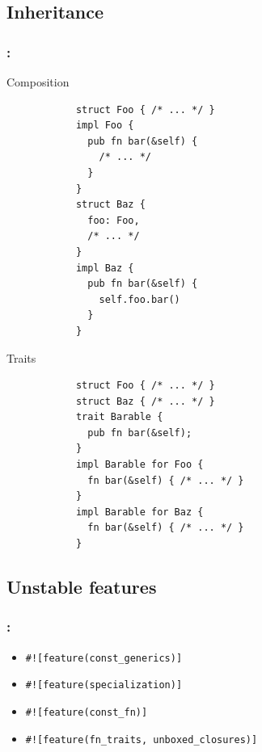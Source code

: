 \documentclass[aspectratio=43, t]{beamer}
\begin{document}
\subsection*{Inheritance}
\begin{frame}[fragile]
	\frametitle{\secname: \subsecname}

	\begin{multicols}{2}
		Composition
		\begin{verbatim}
			struct Foo { /* ... */ }
			impl Foo {
			  pub fn bar(&self) {
			    /* ... */
			  }
			}
			struct Baz {
			  foo: Foo,
			  /* ... */
			}
			impl Baz {
			  pub fn bar(&self) {
			    self.foo.bar()
			  }
			}
		\end{verbatim}
		\columnbreak
		Traits
		\begin{verbatim}
			struct Foo { /* ... */ }
			struct Baz { /* ... */ }
			trait Barable {
			  pub fn bar(&self);
			}
			impl Barable for Foo {
			  fn bar(&self) { /* ... */ }
			}
			impl Barable for Baz {
			  fn bar(&self) { /* ... */ }
			}
		\end{verbatim}
	\end{multicols}
\end{frame}

\subsection*{Unstable features}
\begin{frame}[fragile]
	\frametitle{\secname: \subsecname}

	\begin{itemize}
		\item \texttt{#![feature(const_generics)]}
		\item \texttt{#![feature(specialization)]}
		\item \texttt{#![feature(const_fn)]}
		\item \texttt{#![feature(fn_traits, unboxed_closures)]}
	\end{itemize}
\end{frame}
\end{document}
